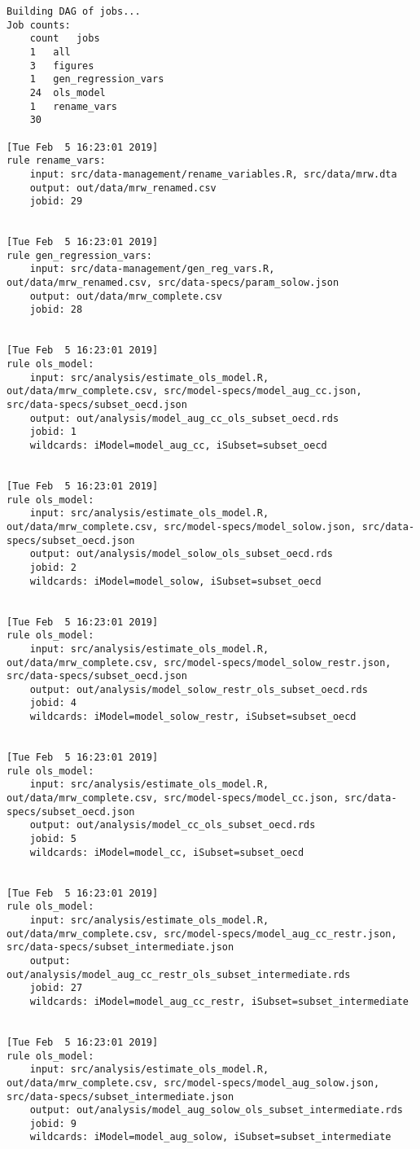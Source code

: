 \documentclass[]{book}
\theoremstyle{definition}
\theoremstyle{definition}
\theoremstyle{definition}
\theoremstyle{remark}
\begin{document}
\begin{verbatim}
Building DAG of jobs...
Job counts:
    count   jobs
    1   all
    3   figures
    1   gen_regression_vars
    24  ols_model
    1   rename_vars
    30

[Tue Feb  5 16:23:01 2019]
rule rename_vars:
    input: src/data-management/rename_variables.R, src/data/mrw.dta
    output: out/data/mrw_renamed.csv
    jobid: 29


[Tue Feb  5 16:23:01 2019]
rule gen_regression_vars:
    input: src/data-management/gen_reg_vars.R, out/data/mrw_renamed.csv, src/data-specs/param_solow.json
    output: out/data/mrw_complete.csv
    jobid: 28


[Tue Feb  5 16:23:01 2019]
rule ols_model:
    input: src/analysis/estimate_ols_model.R, out/data/mrw_complete.csv, src/model-specs/model_aug_cc.json, src/data-specs/subset_oecd.json
    output: out/analysis/model_aug_cc_ols_subset_oecd.rds
    jobid: 1
    wildcards: iModel=model_aug_cc, iSubset=subset_oecd


[Tue Feb  5 16:23:01 2019]
rule ols_model:
    input: src/analysis/estimate_ols_model.R, out/data/mrw_complete.csv, src/model-specs/model_solow.json, src/data-specs/subset_oecd.json
    output: out/analysis/model_solow_ols_subset_oecd.rds
    jobid: 2
    wildcards: iModel=model_solow, iSubset=subset_oecd


[Tue Feb  5 16:23:01 2019]
rule ols_model:
    input: src/analysis/estimate_ols_model.R, out/data/mrw_complete.csv, src/model-specs/model_solow_restr.json, src/data-specs/subset_oecd.json
    output: out/analysis/model_solow_restr_ols_subset_oecd.rds
    jobid: 4
    wildcards: iModel=model_solow_restr, iSubset=subset_oecd


[Tue Feb  5 16:23:01 2019]
rule ols_model:
    input: src/analysis/estimate_ols_model.R, out/data/mrw_complete.csv, src/model-specs/model_cc.json, src/data-specs/subset_oecd.json
    output: out/analysis/model_cc_ols_subset_oecd.rds
    jobid: 5
    wildcards: iModel=model_cc, iSubset=subset_oecd


[Tue Feb  5 16:23:01 2019]
rule ols_model:
    input: src/analysis/estimate_ols_model.R, out/data/mrw_complete.csv, src/model-specs/model_aug_cc_restr.json, src/data-specs/subset_intermediate.json
    output: out/analysis/model_aug_cc_restr_ols_subset_intermediate.rds
    jobid: 27
    wildcards: iModel=model_aug_cc_restr, iSubset=subset_intermediate


[Tue Feb  5 16:23:01 2019]
rule ols_model:
    input: src/analysis/estimate_ols_model.R, out/data/mrw_complete.csv, src/model-specs/model_aug_solow.json, src/data-specs/subset_intermediate.json
    output: out/analysis/model_aug_solow_ols_subset_intermediate.rds
    jobid: 9
    wildcards: iModel=model_aug_solow, iSubset=subset_intermediate



\end{verbatim}
\end{document}
